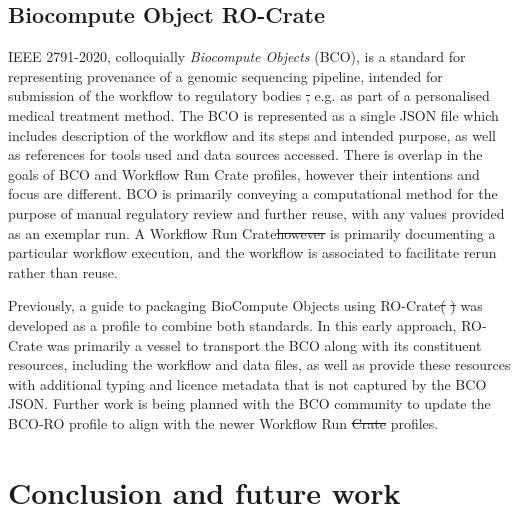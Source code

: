 \documentclass[10pt,letterpaper]{article}
\providecommand{\DIFaddtex}[1]{{\protect\color{blue}\uwave{#1}}} %
\providecommand{\DIFdeltex}[1]{{\protect\color{red}\sout{#1}}}                      %
\providecommand{\DIFaddbegin}{} %
\providecommand{\DIFaddend}{} %
\providecommand{\DIFdelbegin}{} %
\providecommand{\DIFdelend}{} %
\providecommand{\DIFadd}[1]{\texorpdfstring{\DIFaddtex{#1}}{#1}} %
\providecommand{\DIFdel}[1]{\texorpdfstring{\DIFdeltex{#1}}{}} %
\newcommand{\DIFscaledelfig}{0.5}
\newlength{\DIFdelgraphicswidth} %
\newlength{\DIFdelgraphicsheight} %
\newcommand{\DIFaddincludegraphics}[2][]{{\color{blue}\fbox{\DIFOincludegraphics[#1]{#2}}}} %
\newcommand{\DIFdelincludegraphics}[2][]{%
\sbox{\DIFdelgraphicsbox}{\DIFOincludegraphics[#1]{#2}}%
\settoboxwidth{\DIFdelgraphicswidth}{\DIFdelgraphicsbox} %
\settoboxtotalheight{\DIFdelgraphicsheight}{\DIFdelgraphicsbox} %
\scalebox{\DIFscaledelfig}{%
\parbox[b]{\DIFdelgraphicswidth}{\usebox{\DIFdelgraphicsbox}\\[-\baselineskip] \rule{\DIFdelgraphicswidth}{0em}}\llap{\resizebox{\DIFdelgraphicswidth}{\DIFdelgraphicsheight}{%
\setlength{\unitlength}{\DIFdelgraphicswidth}%
\begin{picture}(1,1)%
\thicklines\linethickness{2pt} %
{\color[rgb]{1,0,0}\put(0,0){\framebox(1,1){}}}%
{\color[rgb]{1,0,0}\put(0,0){\line( 1,1){1}}}%
{\color[rgb]{1,0,0}\put(0,1){\line(1,-1){1}}}%
\end{picture}%
}\hspace*{3pt}}} %
} %
\DeclareRobustCommand{\DIFaddbegin}{\DIFOaddbegin \let\includegraphics\DIFaddincludegraphics} %
\DeclareRobustCommand{\DIFaddend}{\DIFOaddend \let\includegraphics\DIFOincludegraphics} %
\DeclareRobustCommand{\DIFdelbegin}{\DIFOdelbegin \let\includegraphics\DIFdelincludegraphics} %
\DeclareRobustCommand{\DIFdelend}{\DIFOaddend \let\includegraphics\DIFOincludegraphics} %
\begin{document}
\subsection{Biocompute Object RO-Crate}\label{bco-crate}
IEEE 2791-2020\DIFaddbegin \DIFadd{~}\DIFaddend \cite{Mazumder 2020}, colloquially \DIFaddbegin \DIFadd{known as }\DIFaddend \emph{Biocompute Objects} (BCO), is a standard for representing provenance of a genomic sequencing pipeline, intended for submission of the workflow to regulatory bodies \DIFdelbegin \DIFdel{, }\DIFdelend \DIFaddbegin \DIFadd{-- }\DIFaddend e.g. as part of a personalised medical treatment method\DIFaddbegin \DIFadd{~}\DIFaddend \cite{Alterovitz 2018}.
The BCO is represented as a single JSON file which includes description of the workflow and its steps and intended purpose, as well as references for tools used and data sources accessed. 
There is overlap in the goals of BCO and Workflow Run Crate profiles, however their intentions and focus are different. 
BCO is primarily conveying a computational method for the purpose of manual regulatory review and further reuse, with any values provided as an exemplar run.  
A Workflow Run Crate\DIFdelbegin \DIFdel{however }\DIFdelend \DIFaddbegin \DIFadd{, however, }\DIFaddend is primarily documenting a particular workflow execution, and the workflow is associated to facilitate rerun rather than reuse. 

Previously, a guide to packaging BioCompute Objects using RO-Crate\DIFdelbegin \DIFdel{(}%
\DIFdel{) }\DIFdelend \DIFaddbegin \DIFadd{~\mbox{%
\cite{bco-roc} }\hskip0pt%
}\DIFaddend was developed as a profile to combine both standards\DIFaddbegin \DIFadd{~}\DIFaddend \cite{Soiland-Reyes 2021}.
In this early approach, RO-Crate was primarily a vessel to transport the BCO along with its constituent resources, including the workflow and data files, as well as \DIFaddbegin \DIFadd{to }\DIFaddend provide these resources with additional typing and licence metadata that is not captured by the BCO JSON.
Further work is being planned with the BCO community to update the BCO-RO profile to align with the newer Workflow Run \DIFdelbegin \DIFdel{Crate }\DIFdelend \DIFaddbegin \DIFadd{RO-Crate }\DIFaddend profiles. 

\DIFdelbegin %
\DIFdelend \DIFaddbegin \hypertarget{conclusion}{%
\section{Conclusion and future work}\label{conclusion}}
\DIFaddend 
\end{document}

